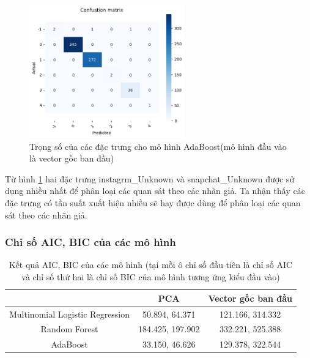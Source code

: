 \begin{enumerate}[label=(\alph*)]
    \begin{figure}[H]
        \centering
        \includegraphics[width=0.6\textwidth]{figures/Thanh/Data_Analysis/Non_null_confusion_matrix_AdaBoost_original_features.png}
        \caption{Trọng số của các đặc trưng cho mô hình AdaBoost(mô hình đầu vào là vector gốc ban đầu)}
        \label{fig:Non_null_confusion_matrix_AdaBoost_original_features}
    \end{figure}

    Từ hình \ref{fig:Non_null_confusion_matrix_AdaBoost_original_features} hai đặc trưng instagrm\_Unknown và snapchat\_Unknown được sử dụng nhiều
    nhất để phân loại các quan sát theo các nhãn giả. Ta nhận thấy các đặc trưng có tần suất xuất hiện nhiều sẽ hay được dùng để phân loại các quan sát theo các nhãn giả.
\end{enumerate}

\subsubsection{Chỉ số AIC, BIC của các mô hình}

\begin{table}[h!]
    \centering
    \begin{tabular}{|c|c|c|}
        \hline
        & PCA & Vector gốc ban đầu \\
        \hline
        Multinomial Logistic Regression & 50.894, 64.371 & 121.166, 314.332 \\
        \hline
        Random Forest & 184.425, 197.902 & 332.221, 525.388 \\
        \hline
        AdaBoost & 33.150, 46.626 & 129.378, 322.544 \\
        \hline
    \end{tabular}
    \caption{Kết quả AIC, BIC của các mô hình (tại mỗi ô chỉ số đầu tiên là chỉ số AIC và chỉ số thứ hai là chỉ số BIC của mô hình tương ứng kiểu đầu vào)}
    \label{tab:Non_null_AIC_BIC_Model_pseudo_clustering_label}
\end{table}

